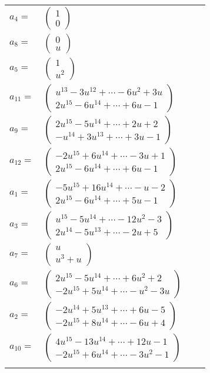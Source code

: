 \documentclass[1p]{elsarticle_modified}
\theoremstyle{definition}
\begin{document}
\begin{tabular}{m{7pt} m{180pt} m{7pt} m{180pt} }
\flushright $a_{4}=$&$\begin{pmatrix}1\\0\end{pmatrix}$ \\
\flushright $a_{8}=$&$\begin{pmatrix}0\\u\end{pmatrix}$ \\
\flushright $a_{5}=$&$\begin{pmatrix}1\\u^2\end{pmatrix}$ \\
\flushright $a_{11}=$&$\begin{pmatrix}u^{13}-3 u^{12}+\cdots-6 u^2+3 u\\2 u^{15}-6 u^{14}+\cdots+6 u-1\end{pmatrix}$ \\
\flushright $a_{9}=$&$\begin{pmatrix}2 u^{15}-5 u^{14}+\cdots+2 u+2\\- u^{14}+3 u^{13}+\cdots+3 u-1\end{pmatrix}$ \\
\flushright $a_{12}=$&$\begin{pmatrix}-2 u^{15}+6 u^{14}+\cdots-3 u+1\\2 u^{15}-6 u^{14}+\cdots+6 u-1\end{pmatrix}$ \\
\flushright $a_{1}=$&$\begin{pmatrix}-5 u^{15}+16 u^{14}+\cdots- u-2\\2 u^{15}-6 u^{14}+\cdots+5 u-1\end{pmatrix}$ \\
\flushright $a_{3}=$&$\begin{pmatrix}u^{15}-5 u^{14}+\cdots-12 u^2-3\\2 u^{14}-5 u^{13}+\cdots-2 u+5\end{pmatrix}$ \\
\flushright $a_{7}=$&$\begin{pmatrix}u\\u^3+u\end{pmatrix}$ \\
\flushright $a_{6}=$&$\begin{pmatrix}2 u^{15}-5 u^{14}+\cdots+6 u^2+2\\-2 u^{15}+5 u^{14}+\cdots- u^2-3 u\end{pmatrix}$ \\
\flushright $a_{2}=$&$\begin{pmatrix}-2 u^{14}+5 u^{13}+\cdots+6 u-5\\-2 u^{15}+8 u^{14}+\cdots-6 u+4\end{pmatrix}$ \\
\flushright $a_{10}=$&$\begin{pmatrix}4 u^{15}-13 u^{14}+\cdots+12 u-1\\-2 u^{15}+6 u^{14}+\cdots-3 u^2-1\end{pmatrix}$\\&\end{tabular}
\end{document}
